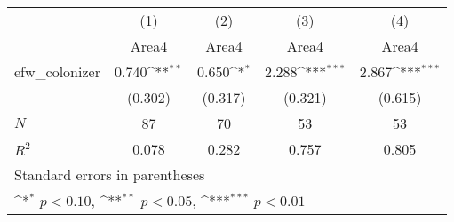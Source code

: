 {
\def\sym#1{\ifmmode^{#1}\else\(^{#1}\)\fi}
\begin{tabular}{l*{4}{c}}
\hline\hline
            &\multicolumn{1}{c}{(1)}&\multicolumn{1}{c}{(2)}&\multicolumn{1}{c}{(3)}&\multicolumn{1}{c}{(4)}\\
            &\multicolumn{1}{c}{Area4}&\multicolumn{1}{c}{Area4}&\multicolumn{1}{c}{Area4}&\multicolumn{1}{c}{Area4}\\
\hline
efw\_colonizer&       0.740\sym{**} &       0.650\sym{*}  &       2.288\sym{***}&       2.867\sym{***}\\
            &     (0.302)         &     (0.317)         &     (0.321)         &     (0.615)         \\
\hline
\(N\)       &          87         &          70         &          53         &          53         \\
\(R^{2}\)   &       0.078         &       0.282         &       0.757         &       0.805         \\
\hline\hline
\multicolumn{5}{l}{\footnotesize Standard errors in parentheses}\\
\multicolumn{5}{l}{\footnotesize \sym{*} \(p<0.10\), \sym{**} \(p<0.05\), \sym{***} \(p<0.01\)}\\
\end{tabular}
}
